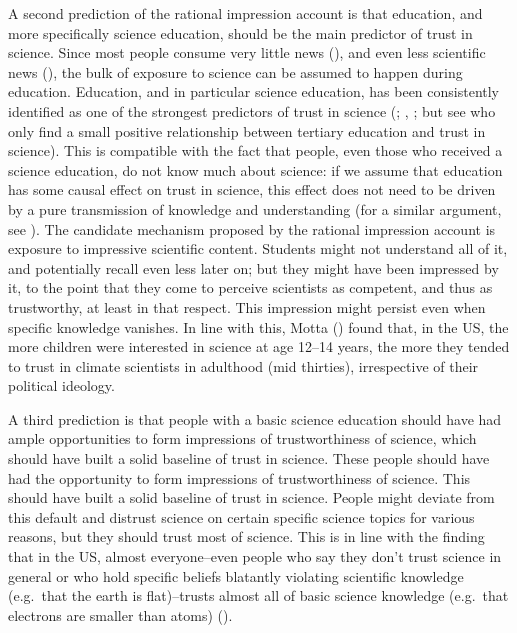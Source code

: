 \documentclass[
  jou,
  floatsintext,
  longtable,
  nolmodern,
  notxfonts,
  notimes,
  colorlinks=true,linkcolor=blue,citecolor=blue,urlcolor=blue]{apa7}
\begin{document}
A second prediction of the rational impression account is that
education, and more specifically science education, should be the main
predictor of trust in science. Since most people consume very little
news (),
and even less scientific news
(), the
bulk of exposure to science can be assumed to happen during education.
Education, and in particular science education, has been consistently
identified as one of the strongest predictors of trust in science
(;
,
; but
see 
who only find a small positive relationship between tertiary education
and trust in science). This is compatible with the fact that people,
even those who received a science education, do not know much about
science: if we assume that education has some causal effect on trust in
science, this effect does not need to be driven by a pure transmission
of knowledge and understanding (for a similar argument, see
). The
candidate mechanism proposed by the rational impression account is
exposure to impressive scientific content. Students might not understand
all of it, and potentially recall even less later on; but they might
have been impressed by it, to the point that they come to perceive
scientists as competent, and thus as trustworthy, at least in that
respect. This impression might persist even when specific knowledge
vanishes. In line with this, Motta
() found that, in
the US, the more children were interested in science at age 12--14
years, the more they tended to trust in climate scientists in adulthood
(mid thirties), irrespective of their political ideology.

A third prediction is that people with a basic science education should
have had ample opportunities to form impressions of trustworthiness of
science, which should have built a solid baseline of trust in science.
These people should have had the opportunity to form impressions of
trustworthiness of science. This should have built a solid baseline of
trust in science. People might deviate from this default and distrust
science on certain specific science topics for various reasons, but they
should trust most of science. This is in line with the finding that in
the US, almost everyone--even people who say they don't trust science in
general or who hold specific beliefs blatantly violating scientific
knowledge (e.g.~that the earth is flat)--trusts almost all of basic
science knowledge (e.g.~that electrons are smaller than atoms)
().
\end{document}
